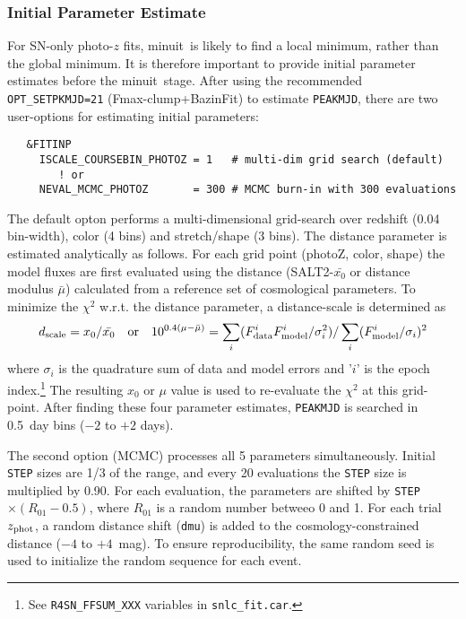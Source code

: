\documentclass[12pt]{article}
\newcommand{\Zphot}{z_{\rm phot}}
\newcommand{\minuit}{{\sc minuit}}
\begin{document}
   \subsubsection{Initial Parameter Estimate}
   \label{sss:photoz_ini}

\newcommand{\dSCALE}{d_{\rm scale}}
\newcommand{\Fdata}{F_{\rm data}^i}
\newcommand{\Fmodel}{F_{\rm model}^i}

For SN-only photo-$z$ fits, \minuit\ is likely to find a
local minimum, rather than the global minimum. It is therefore
important to provide initial parameter estimates before the
\minuit\ stage. 
After using the recommended {\tt OPT\_SETPKMJD=21} (Fmax-clump+BazinFit)
to estimate {\tt PEAKMJD},
there are two user-options for estimating initial parameters:
\begin{verbatim}
   &FITINP
     ISCALE_COURSEBIN_PHOTOZ = 1   # multi-dim grid search (default)
        ! or
     NEVAL_MCMC_PHOTOZ       = 300 # MCMC burn-in with 300 evaluations
\end{verbatim} 
%
The default opton performs a multi-dimensional grid-search over 
redshift (0.04 bin-width), color (4 bins) and stretch/shape (3 bins).
The distance parameter is estimated analytically as follows.
For each grid point (photoZ, color, shape) the model fluxes
are first evaluated using the distance
(SALT2-$\bar{x_0}$ or distance modulus $\bar\mu$) 
calculated from a reference set of cosmological parameters. 
To minimize the $\chi^2$ w.r.t. the
distance parameter, a distance-scale 
is determined as
\begin{equation}
  \dSCALE = x_0/\bar{x_0} {\rm ~~~ or~~~} 10^{0.4(\mu-\bar{\mu})}
    = \sum_i( \Fdata\Fmodel/\sigma_i^2) / \sum_i(\Fmodel/\sigma_i)^2
\end{equation}
where $\sigma_i$ is the quadrature sum of data and model errors
and '$i$' is the epoch index.\footnote{See {\tt R4SN\_FFSUM\_XXX} 
   variables in {\tt snlc\_fit.car}.}
The resulting $x_0$ or $\mu$ value is used to re-evaluate
the $\chi^2$ at this grid-point. 
After finding these four parameter estimates, 
{\tt PEAKMJD} is searched in 0.5~day bins ($-2$ to $+2$ days).


The second option (MCMC) processes all 5 parameters simultaneously.
Initial {\tt STEP} sizes are 1/3 of the range, and every 20 evaluations
the {\tt STEP} size is multiplied by 0.90. For each evaluation, the
parameters are shifted by {\tt STEP}$\times(R_{01}-0.5)$,
where $R_{01}$ is a random number betweeo 0 and 1.
For each trial $\Zphot$, a random distance shift ({\tt dmu}) is added 
to the cosmology-constrained distance ($-4$ to $+4$~mag).
To ensure reproducibility, the same random seed is used to 
initialize the random sequence for each event.
\end{document}
